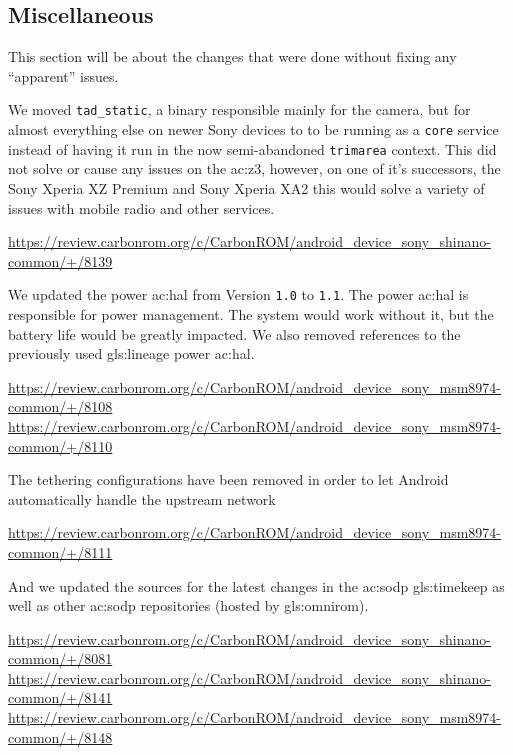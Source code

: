 \subsection{Miscellaneous}

This section will be about the changes that were done without fixing any \enquote{apparent} issues.

We moved \texttt{tad\_static}, a binary responsible mainly for the camera, but for almost everything else on newer Sony devices to to be running as a \texttt{core} service instead of having it run in the now semi-abandoned \texttt{trimarea} context. This did not solve or cause any issues on the \acrshort{ac:z3}, however, on one of it's successors, the Sony Xperia XZ Premium and Sony Xperia XA2 this would solve a variety of issues with mobile radio and other services.

\url{https://review.carbonrom.org/c/CarbonROM/android_device_sony_shinano-common/+/8139}

We updated the power \acrshort{ac:hal} from Version \texttt{1.0} to \texttt{1.1}. The power \acrshort{ac:hal} is responsible for power management. The system would work without it, but the battery life would be greatly impacted. We also removed references to the previously used \gls{gls:lineage} power \acrshort{ac:hal}.

\url{https://review.carbonrom.org/c/CarbonROM/android_device_sony_msm8974-common/+/8108}\\
\url{https://review.carbonrom.org/c/CarbonROM/android_device_sony_msm8974-common/+/8110}

The tethering configurations have been removed in order to let Android automatically handle the upstream network

\url{https://review.carbonrom.org/c/CarbonROM/android_device_sony_msm8974-common/+/8111} 

And we updated the sources for the latest changes in the \acrshort{ac:sodp} \gls{gls:timekeep} as well as other \acrshort{ac:sodp} repositories (hosted by \gls{gls:omnirom}).

\url{https://review.carbonrom.org/c/CarbonROM/android_device_sony_shinano-common/+/8081}\\
\url{https://review.carbonrom.org/c/CarbonROM/android_device_sony_shinano-common/+/8141}\\
\url{https://review.carbonrom.org/c/CarbonROM/android_device_sony_msm8974-common/+/8148}

